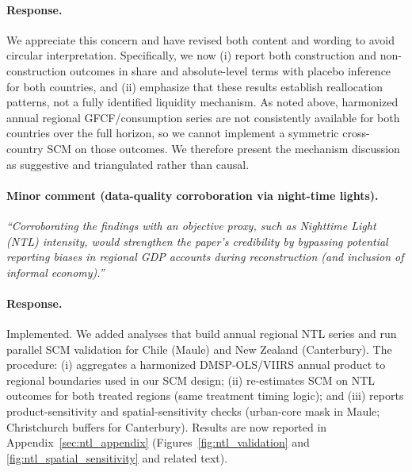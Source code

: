 \paragraph{Response.}
We appreciate this concern and have revised both content and wording to avoid circular interpretation. Specifically, we now (i) report both construction and non-construction outcomes in share and absolute-level terms with placebo inference for both countries, and (ii) emphasize that these results establish reallocation patterns, not a fully identified liquidity mechanism. As noted above, harmonized annual regional GFCF/consumption series are not consistently available for both countries over the full horizon, so we cannot implement a symmetric cross-country SCM on those outcomes. We therefore present the mechanism discussion as suggestive and triangulated rather than causal.

\paragraph{Minor comment (data-quality corroboration via night-time lights).}
\textit{``Corroborating the findings with an objective proxy, such as Nighttime Light (NTL) intensity, would strengthen the paper's credibility by bypassing potential reporting biases in regional GDP accounts during reconstruction (and inclusion of informal economy).''}

\paragraph{Response.}
Implemented. We added analyses that build annual regional NTL series and run parallel SCM validation for Chile (Maule) and New Zealand (Canterbury). The procedure: (i) aggregates a harmonized DMSP-OLS/VIIRS annual product to regional boundaries used in our SCM design; (ii) re-estimates SCM on NTL outcomes for both treated regions (same treatment timing logic); and (iii) reports product-sensitivity and spatial-sensitivity checks (urban-core mask in Maule; Christchurch buffers for Canterbury). Results are now reported in Appendix~\ref{sec:ntl_appendix} (Figures~\ref{fig:ntl_validation} and \ref{fig:ntl_spatial_sensitivity} and related text).

